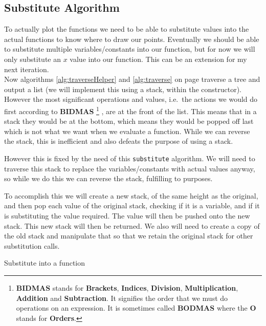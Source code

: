 \documentclass[../../../../../main.tex]{subfiles}
\begin{document}
\subsection{Substitute Algorithm}
To actually plot the functions we need to be able to substitute values into the actual functions to know where to draw our points. Eventually we should be able to substitute multiple variables/constants into our function, but for now we will only substitute an $x$ value into our function. This can be an extension for my next iteration.\\
Now algorithms \ref{alg:traverseHelper} and \ref{alg:traverse} on page \pageref{alg:traverseHelper} traverse a tree and output a list (we will implement this using a stack, within the constructor). However the most significant operations and values, i.e.\ the actions we would do first according to \textbf{BIDMAS}
\footnote{\textbf{BIDMAS} stands for \textbf{Brackets}, \textbf{Indices}, \textbf{Division}, \textbf{Multiplication}, \textbf{Addition} and \textbf{Subtraction}. It signifies the order that we must do operations on an expression. It is sometimes called \textbf{BODMAS} where the \textbf{O} stands for \textbf{Orders}.}
, are at the front of the list. This means that in a stack they would be at the bottom, which means they would be popped off last which is not what we want when we evaluate a function. While we can reverse the stack, this is inefficient and also defeats the purpose of using a stack.

However this is fixed by the need of this \texttt{substitute} algorithm. We will need to traverse this stack to replace the variables/constants with actual values anyway, so while we do this we can reverse the stack, fulfilling to purposes.

To accomplish this we will create a new stack, of the same height as the original, and then pop each value of the original stack, checking if it is a variable, and if it is substituting the value required. The value will then be pushed onto the new stack. This new stack will then be returned. We also will need to create a copy of the old stack and manipulate that so that we retain the original stack for other substitution calls.

\begin{algorithm}
\caption{Substitute into a function}
\DontPrintSemicolon
{}
\end{algorithm}
\newpage
\end{document}
